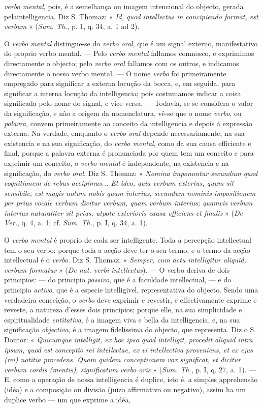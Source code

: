 \emph{verbo mental}, pois, é a semelhança ou imagem intencional do objecto, gerada pelaintelligencia. Diz S. Thomaz: « \emph{Id, quod intellectus in concipiendo format, est verbum} » (\emph{Sum. Th.}, p. 1, q. 34, a. 1 ad 2).\par O \emph{verbo mental} distingue-se do \emph{verbo oral}, que é um signal externo, manifestativo do proprio verbo mental. --- Pelo \emph{verbo mental} fallamos comnosco, e exprimimos directamente o objecto; pelo \emph{verbo oral} fallamos com os outros, e indicamos directamente o nosso verbo mental. --- O nome \emph{verbo} foi primeiramente empregado para significar a externa locução da bocca, e, em seguida, para significar a interna locução da intelligencia; pois costumamos indicar a coisa significada pelo nome do signal, e vice-versa. --- Todavia, se se considera o valor da significação, e não a origem da nomenclatura, vê-se que o nome \emph{verbo}, ou \emph{palavra}, convem primeiramente ao conceito da intelligencia e depois á expressão externa. Na verdade, emquanto o \emph{verbo oral} depende necessariamente, na sua existencia e na sua significação, do \emph{verbo mental}, como da sua causa efficiente e final, porque a palavra externa é pronunciada por quem tem um conceito e para exprimir um conceito, o \emph{verbo mental} é independente, na existencia e na significação, do \emph{verbo oral}. Diz S. Thomaz: « \emph{Nomina imponuntur secundum quod cognitionem de rebus accipimus... Et ideo, quia verbum exterius, quum sit sensibile, est magis notum nobis quam interius, secundum nominis impositionem per prius vocale verbum dicitur verbum, quam verbum interius; quamvis verbum interius naturaliter sit prius, utpote exterioris causa efficiens et finalis} » (\emph{De Ver.}, q. 4, a. 1; cf. \emph{Sum. Th.}, p. I, q. 34, a. 1).\par O \emph{verbo mental} é proprio de cada ser intelligente. Toda a percepção intellectual tem o seu verbo; porque toda a acção deve ter o seu termo, e o termo da acção intellectual é o \emph{verbo}. Diz S. Thomaz: « \emph{Semper, cum actu intelligitur aliquid, verbum formatur} » (\emph{De nat. verbi intellectus}). --- O verbo deriva de dois principios: --- do principio \emph{passivo}, que é a faculdade intellectual, --- e do principio \emph{activo}, que é a especie intelligivel, representativa do objecto. Sendo uma verdadeira conceição, o \emph{verbo} deve exprimir e revestir, e effectivamente exprime e reveste, a natureza d'esses dois principios; porque elle, na sua simplicidade e espiritualidade \emph{entitativa}, é a imagem viva e bella da intelligencia, e, na sua significação \emph{objectiva}, é a imagem fidelissima do objecto, que representa. Diz o S. Doutor: « \emph{Quicumque intelligit, ex hoc ipso quod intelligit, procedit aliquid intra ipsum, quod est conceptio rei intellectae, ex vi intellectiva proveniens, et ex ejus (rei) notitia procedens. Quam quidem conceptionem vox significat, et dicitur verbum cordis (mentis), significatum verbo oris} » (\emph{Sum. Th.}, p. I, q. 27, a. 1). --- E, como a operação de nossa intelligencia é duplice, isto é, a simples apprehensão (idéa) e a composição ou divisão (juizo affirmativo ou negativo), assim ha um duplice verbo --- um que exprime a idéa, 